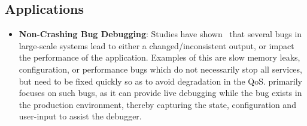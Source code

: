 \subsection{Applications}
\label{sec:impact}


\begin{itemize}[leftmargin=*,topsep=0pt,itemsep=-1ex,partopsep=1ex,parsep=1ex]

\item \textbf{Non-Crashing Bug Debugging}: 
Studies have shown~\cite{Zhang:2013:ADS:2486788.2486830, liu2005mining, kremenek2007factor} that several bugs in large-scale systems lead to either a changed/inconsistent output, or impact the performance of the application. 
Examples of this are slow memory leaks, configuration, or performance bugs which do not necessarily stop all services, but need to be fixed quickly so as to avoid degradation in the QoS. 
\parikshan primarily focuses on such bugs, as it can provide live debugging while the bug exists in the production environment, thereby capturing the state, configuration and user-input to assist the debugger.


\end{itemize}
